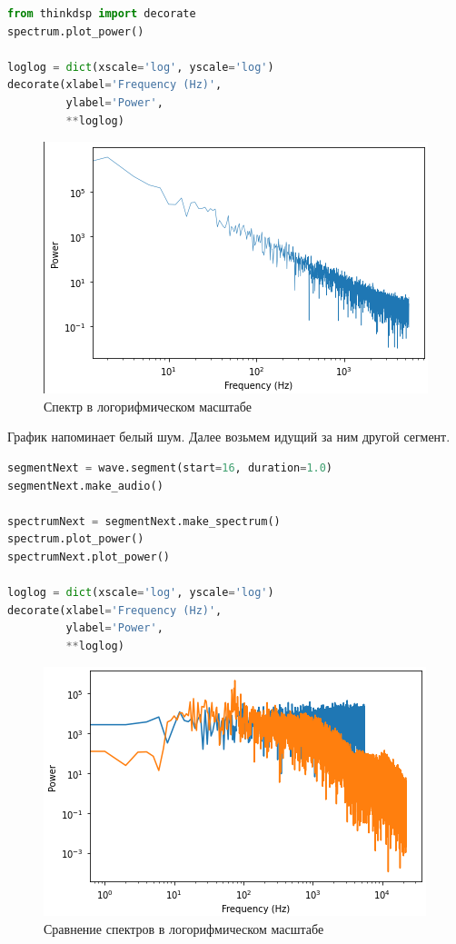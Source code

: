 \begin{lstlisting}[language=Python]
from thinkdsp import decorate
spectrum.plot_power()

loglog = dict(xscale='log', yscale='log')
decorate(xlabel='Frequency (Hz)',
         ylabel='Power', 
         **loglog)
\end{lstlisting}
\begin{figure}[H]
	\begin{center}
		\includegraphics[scale=1]{fig/lab04/lab4_2.png}
		\caption{Спектр в логорифмическом масштабе}
	\end{center}
\end{figure}

График напоминает белый шум. Далее возьмем идущий за ним другой сегмент.

\begin{lstlisting}[language=Python]
segmentNext = wave.segment(start=16, duration=1.0)
segmentNext.make_audio()

spectrumNext = segmentNext.make_spectrum()
spectrum.plot_power()
spectrumNext.plot_power()

loglog = dict(xscale='log', yscale='log')
decorate(xlabel='Frequency (Hz)',
         ylabel='Power', 
         **loglog)
\end{lstlisting}
\begin{figure}[H]
	\begin{center}
		\includegraphics[scale=1]{fig/lab04/lab4_3.png}
		\caption{Сравнение спектров в логорифмическом масштабе}
	\end{center}
\end{figure}


